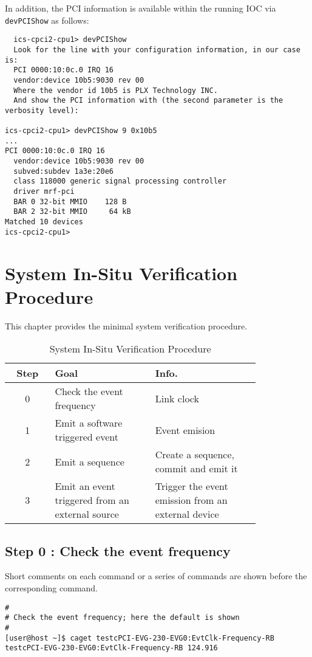 \documentclass[11pt
  , a4paper
  , article
  , oneside
  , showtrims
]{memoir}
\begin{document}
In addition, the PCI information is available within the running IOC via \texttt{devPCIShow} as follows:
\begin{lstlisting}
  ics-cpci2-cpu1> devPCIShow
  Look for the line with your configuration information, in our case is:
  PCI 0000:10:0c.0 IRQ 16
  vendor:device 10b5:9030 rev 00
  Where the vendor id 10b5 is PLX Technology INC.
  And show the PCI information with (the second parameter is the verbosity level):

ics-cpci2-cpu1> devPCIShow 9 0x10b5
...
PCI 0000:10:0c.0 IRQ 16
  vendor:device 10b5:9030 rev 00
  subved:subdev 1a3e:20e6
  class 118000 generic signal processing controller
  driver mrf-pci
  BAR 0 32-bit MMIO    128 B
  BAR 2 32-bit MMIO     64 kB
Matched 10 devices
ics-cpci2-cpu1>
\end{lstlisting}

\newpage
\chapter{System In-Situ Verification Procedure}
This chapter provides the minimal system verification procedure.
\begin{table}[!htb]
  \centering
  \begin{tabular}{c|p{0.4\linewidth}|p{0.42\linewidth}}
    \toprule
    Step & Goal                                             & Info.                                                  \\\midrule
    0    & Check the event frequency                        & Link clock                                             \\\midrule
    1    & Emit a software triggered event                 & Event emision                                         \\\midrule
    2    & Emit a sequence                                 & Create a sequence, commit and emit it                 \\\midrule
    3    & Emit an event triggered from an external source & Trigger the event emission from an external device     \\\bottomrule
  \end{tabular}
  \caption[]{System In-Situ Verification Procedure}
  \label{table:checklist}
\end{table}


\section{Step 0 : Check the event frequency}
Short comments on each command or a series of commands are shown before the corresponding command.
\begin{lstlisting}[style=termstyle]
#
# Check the event frequency; here the default is shown
#
[user@host ~]$ caget testcPCI-EVG-230-EVG0:EvtClk-Frequency-RB
testcPCI-EVG-230-EVG0:EvtClk-Frequency-RB 124.916
\end{lstlisting}
\end{document}
